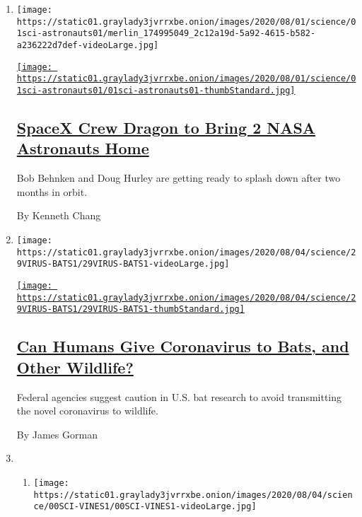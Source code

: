 \begin{enumerate}
\def\labelenumi{\arabic{enumi}.}
\item
  \texttt{[image: https://static01.graylady3jvrrxbe.onion/images/2020/08/01/science/01sci-astronauts01/merlin\_174995049\_2c12a19d-5a92-4615-b582-a236222d7def-videoLarge.jpg]}

  \href{/2020/08/01/science/nasa-spacex-astronauts.html}{\texttt{[image: https://static01.graylady3jvrrxbe.onion/images/2020/08/01/science/01sci-astronauts01/01sci-astronauts01-thumbStandard.jpg]}}

  \hypertarget{spacex-crew-dragon-to-bring-2-nasa-astronauts-home}{%
  \subsection{\texorpdfstring{\href{/2020/08/01/science/nasa-spacex-astronauts.html}{SpaceX
  Crew Dragon to Bring 2 NASA Astronauts
  Home}}{SpaceX Crew Dragon to Bring 2 NASA Astronauts Home}}\label{spacex-crew-dragon-to-bring-2-nasa-astronauts-home}}

  Bob Behnken and Doug Hurley are getting ready to splash down after two
  months in orbit.

  By Kenneth Chang
\item
  \texttt{[image: https://static01.graylady3jvrrxbe.onion/images/2020/08/04/science/29VIRUS-BATS1/29VIRUS-BATS1-videoLarge.jpg]}

  \href{/2020/08/01/science/Covid-bats.html}{\texttt{[image: https://static01.graylady3jvrrxbe.onion/images/2020/08/04/science/29VIRUS-BATS1/29VIRUS-BATS1-thumbStandard.jpg]}}

  \hypertarget{can-humans-give-coronavirus-to-bats-and-other-wildlife}{%
  \subsection{\texorpdfstring{\href{/2020/08/01/science/Covid-bats.html}{Can
  Humans Give Coronavirus to Bats, and Other
  Wildlife?}}{Can Humans Give Coronavirus to Bats, and Other Wildlife?}}\label{can-humans-give-coronavirus-to-bats-and-other-wildlife}}

  Federal agencies suggest caution in U.S. bat research to avoid
  transmitting the novel coronavirus to wildlife.

  By James Gorman
\item
  \begin{enumerate}
  \def\labelenumii{\arabic{enumii}.}
  \item
    \texttt{[image: https://static01.graylady3jvrrxbe.onion/images/2020/08/04/science/00SCI-VINES1/00SCI-VINES1-videoLarge.jpg]}


\end{enumerate}
\end{enumerate}
